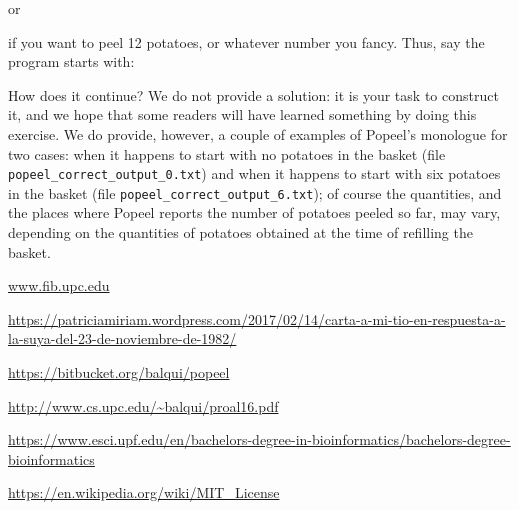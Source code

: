 \documentclass[12pt]{article}
\begin{document}

\noindent
or


\noindent
if you want to peel 12 potatoes, or whatever number
you fancy. Thus, say the program starts with:




How does it continue? We do not provide a solution:
it is your task to construct it, and we hope that
some readers will have learned something by doing
this exercise. We do provide, however, a couple of
examples of Popeel's monologue for two cases:
when it happens to start with no potatoes in the
basket (file {\tt popeel_correct_output_0.txt})
and when it happens to start with six potatoes in the
basket (file {\tt popeel_correct_output_6.txt});
of course the quantities, and the places where
Popeel reports the number of potatoes peeled so far,
may vary, depending on the quantities of potatoes
obtained at the time of refilling the basket.

\begin{thebibliography}{10}

\url{www.fib.upc.edu}

\url{https://patriciamiriam.wordpress.com/2017/02/14/carta-a-mi-tio-en-respuesta-a-la-suya-del-23-de-noviembre-de-1982/}

\url{https://bitbucket.org/balqui/popeel}

\url{http://www.cs.upc.edu/~balqui/proal16.pdf}

\url{https://www.esci.upf.edu/en/bachelors-degree-in-bioinformatics/bachelors-degree-bioinformatics}

\url{https://en.wikipedia.org/wiki/MIT_License}

\end{thebibliography}
\end{document}
